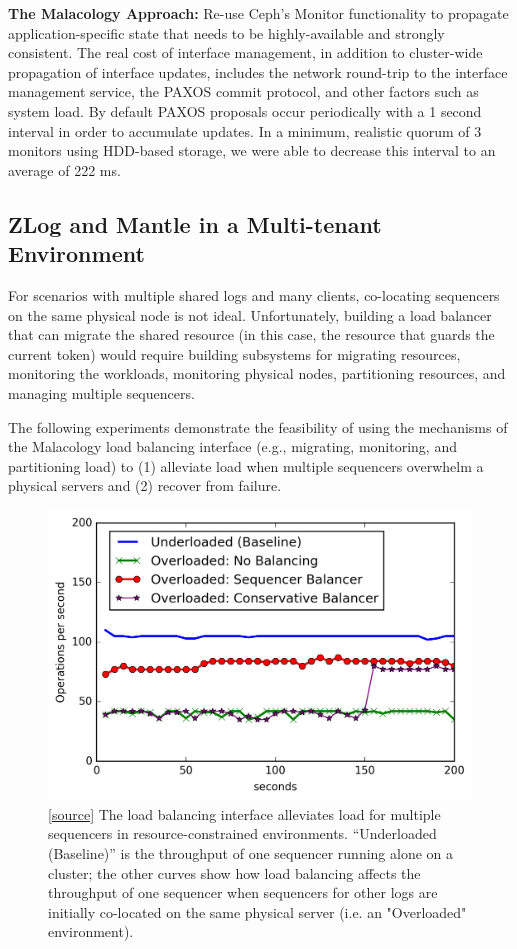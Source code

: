 \documentclass[preprint]{sigplanconf-eurosys}
\begin{document}
\textbf{The Malacology Approach:} Re-use Ceph's Monitor functionality to
propagate application-specific state that needs to be highly-available and
strongly consistent.  The real cost of interface management, in addition to
cluster-wide propagation of interface updates, includes the network round-trip
to the interface management service, the PAXOS commit protocol, and other
factors such as system load. By default PAXOS proposals occur periodically with
a 1 second interval in order to accumulate updates. In a minimum, realistic
quorum of 3 monitors using HDD-based storage, we were able to decrease this
interval to an average of 222 ms.

\subsection{ZLog and Mantle in a Multi-tenant Environment}

For scenarios with multiple shared logs and many clients, co-locating
sequencers on the same physical node is not ideal. Unfortunately, building a
load balancer that can migrate the shared resource (in this case, the resource
that guards the current token) would require building subsystems for migrating
resources, monitoring the workloads, monitoring physical nodes, partitioning
resources, and managing multiple sequencers.

The following experiments demonstrate the feasibility of using the mechanisms
of the Malacology load balancing interface (e.g., migrating, monitoring, and
partitioning load) to (1) alleviate load when multiple sequencers overwhelm a
physical servers and (2) recover from failure.

\begin{figure}[t!]
\centering
\includegraphics{figures/mantle-seq-thruput.png}
\caption{[\href{https://github.com/double-blind-submitter/osdi16}{source}] The
load balancing interface alleviates load for multiple sequencers in
resource-constrained environments.  ``Underloaded (Baseline)'' is the
throughput of one sequencer running alone on a cluster; the other curves show
how load balancing affects the throughput of one sequencer when sequencers for
other logs are initially co-located on the same physical server (i.e. an
"Overloaded" environment).}\label{fig:mantle-seq-thruput}
\end{figure}
\end{document}
